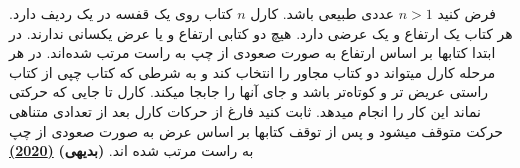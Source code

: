 فرض کنید $n > 1$ عددی طبیعی باشد. کارل $n$ کتاب روی یک قفسه در یک ردیف دارد. 
هر کتاب یک ارتفاع و یک عرضی دارد. 
هیچ دو کتابی ارتفاع و یا عرض یکسانی ندارند.
در ابتدا کتابها بر اساس ارتفاع به صورت صعودی از چپ به راست مرتب شده‌اند.
 در هر مرحله کارل میتواند دو کتاب مجاور را انتخاب کند و به شرطی که کتاب چپی از کتاب راستی عریض تر و کوتاه‌تر باشد
 و جای آنها را جابجا میکند.
 کارل تا جایی که حرکتی نماند این کار را انجام میدهد.
 ثابت کنید فارغ از حرکات کارل بعد از تعدادی متناهی حرکت متوقف میشود و پس از توقف کتابها بر اساس عرض به صورت صعودی از چپ به راست مرتب شده اند.
 \textbf{(بدیهی)}
 \href{https://artofproblemsolving.com/community/c5h2156980p15952780}{\textbf{(2020)}}